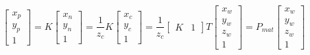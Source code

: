 \begin{equation}
  \begin{bmatrix}
    x_p \\ y_p \\ 1 
  \end{bmatrix}
  = K
    \begin{bmatrix}
      x_n \\ y_n \\ 1
    \end{bmatrix}
  = \frac{1}{z_c} K 
    \begin{bmatrix}
      x_c \\ y_c \\ 1
    \end{bmatrix}
  = \frac{1}{z_c} 
    \begin{bmatrix}
      K & 1
    \end{bmatrix}
    T
    \begin{bmatrix}
      x_w \\ y_w \\ z_w \\ 1
    \end{bmatrix}
  = P_{mat}
    \begin{bmatrix}
      x_w \\ y_w \\ z_w \\ 1
    \end{bmatrix}
\label{eq:idp6}
\end{equation}